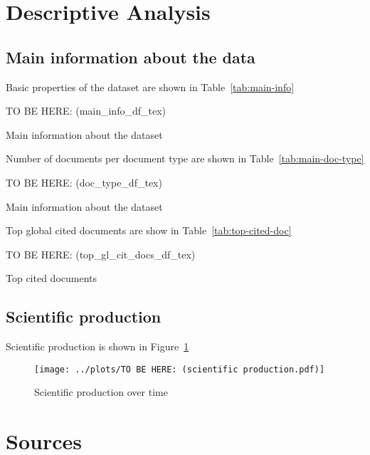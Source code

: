 \documentclass[a4paper,10pt]{article}
\begin{document}


\section{Descriptive Analysis}

\subsection{Main information about the data}

Basic properties of the dataset are shown in Table~\ref{tab:main-info}

\begin{table}[htbp!]
TO BE HERE: (main_info_df_tex)
\caption{Main information about the dataset}
\label{tab:main-info}
\end{table}

Number of documents per document type are shown in Table~\ref{tab:main-doc-type}

\begin{table}[htbp!]
TO BE HERE: (doc_type_df_tex)
\caption{Main information about the dataset}
\label{tab:main-doc-type}
\end{table}

Top global cited documents are show in Table~\ref{tab:top-cited-doc}

\begin{table}[htbp!]
	TO BE HERE: (top_gl_cit_docs_df_tex)
	\caption{Top cited documents}
	\label{tab:top-cited-doc}
\end{table}

\subsection{Scientific production}

Scientific production is shown in Figure~\ref{fig:spot}

\begin{figure}
	\centering
	\texttt{[image: ../plots/TO BE HERE: (scientific production.pdf)]}
	\caption{Scientific production over time}
	\label{fig:spot}
\end{figure}



\section{Sources}
\end{document}

